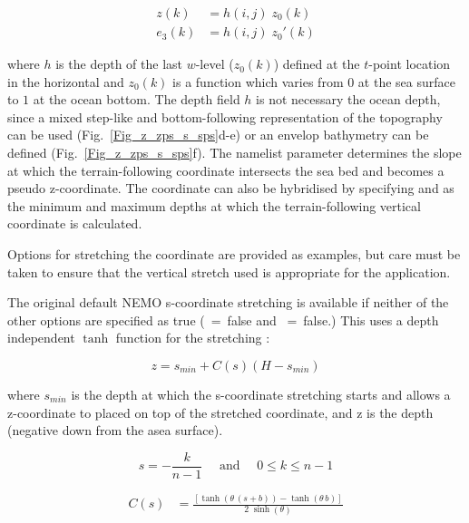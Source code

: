 {\begin{equation} \label{DOM_sco_ana}
\begin{split}
 z(k) 		&= h(i,j) \; z_0(k)	\\
 e_3(k)	&= h(i,j) \; z_0'(k)
\end{split}
\end{equation}

where $h$ is the depth of the last $w$-level ($z_0(k)$) defined at the $t$-point 
location in the horizontal and $z_0(k)$ is a function which varies from $0$ at the sea 
surface to $1$ at the ocean bottom. The depth field $h$ is not necessary the ocean 
depth, since a mixed step-like and bottom-following representation of the 
topography can be used (Fig.~\ref{Fig_z_zps_s_sps}d-e) or an envelop bathymetry can be defined (Fig.~\ref{Fig_z_zps_s_sps}f).
The namelist parameter  determines the slope at which the terrain-following coordinate intersects the sea bed and becomes a pseudo z-coordinate. The coordinate can also be hybridised by specifying  and  as the minimum and maximum depths at which the terrain-following vertical coordinate is calculated.

Options for stretching the coordinate are provided as examples, but care must be taken to ensure that the vertical stretch used is appropriate for the application.

The original default NEMO s-coordinate stretching is available if neither of the other options are specified as true (~=~false and ~=~false.) This uses a depth independent $\tanh$ function for the stretching \citep{Madec_al_JPO96}:

\begin{equation}
  z = s_{min}+C\left(s\right)\left(H-s_{min}\right)
  \label{eq:SH94_1}
\end{equation}

where $s_{min}$ is the depth at which the s-coordinate stretching starts and allows a z-coordinate to placed on top of the stretched coordinate, and z is the depth (negative down from the asea surface).

\begin{equation}
  s = -\frac{k}{n-1} \quad \text{ and } \quad 0 \leq k \leq n-1
  \label{eq:s}
\end{equation}

\begin{equation} \label{DOM_sco_function}
\begin{split}
C(s)	&=  \frac{ \left[	  \tanh{ \left( \theta \, (s+b) \right)} 
	  	 			- \tanh{ \left(  \theta \, b      \right)}  \right]}
		      {2\;\sinh \left( \theta \right)}
\end{split}
\end{equation}

}

